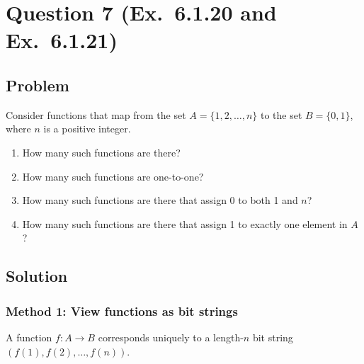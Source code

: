 \documentclass[12pt]{article}
\begin{document}

\newpage
\section{Question 7 (Ex.\ 6.1.20 and Ex.\ 6.1.21)}
\subsection{Problem}
Consider functions that map from the set $A=\{1,2,\dots,n\}$ to the set $B=\{0,1\}$, where $n$ is a positive integer.
\begin{enumerate}[label=(\alph*)]
\item How many such functions are there?
\item How many such functions are one-to-one?
\item How many such functions are there that assign 0 to both 1 and $n$?
\item How many such functions are there that assign 1 to exactly one element in $A$?
\end{enumerate}

\subsection{Solution}

\subsubsection{Method 1: View functions as bit strings}
A function $f:A\to B$ corresponds uniquely to a length-$n$ bit string $(f(1),f(2),\dots,f(n))$.
\end{document}
